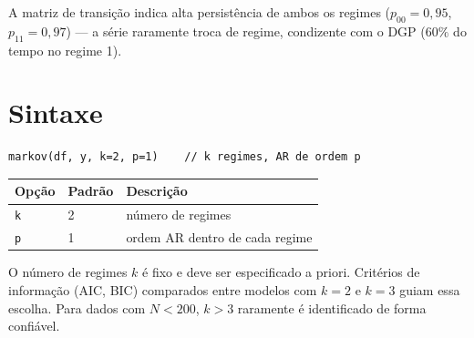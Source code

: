 A matriz de transição indica alta persistência de ambos os regimes
($p_{00} = 0{,}95$, $p_{11} = 0{,}97$) — a série raramente troca de regime,
condizente com o DGP ($60\%$ do tempo no regime 1).

\section{Sintaxe}

\begin{lstlisting}
markov(df, y, k=2, p=1)    // k regimes, AR de ordem p
\end{lstlisting}

\begin{center}
\begin{tabular}{lll}
\toprule
\textbf{Opção} & \textbf{Padrão} & \textbf{Descrição} \\
\midrule
\texttt{k} & 2 & número de regimes \\
\texttt{p} & 1 & ordem AR dentro de cada regime \\
\bottomrule
\end{tabular}
\end{center}

\begin{nota}
  O número de regimes $k$ é fixo e deve ser especificado a priori.
  Critérios de informação (AIC, BIC) comparados entre modelos com $k=2$ e
  $k=3$ guiam essa escolha. Para dados com $N < 200$, $k > 3$ raramente é
  identificado de forma confiável.
\end{nota}
